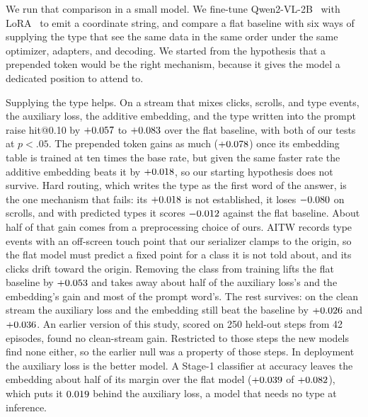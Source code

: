 \documentclass[letterpaper]{article} %
\makeatletter
\newcommand{\hitat}[1]{hit@#1}
\makeatother
\begin{document}
We run that comparison in a small model. We fine-tune Qwen2-VL-2B~\citep{qwen2vl} with LoRA~\citep{lora} to emit a coordinate string, and compare a flat baseline with six ways of supplying the type that see the same data in the same order under the same optimizer, adapters, and decoding. We started from the hypothesis that a prepended token would be the right mechanism, because it gives the model a dedicated position to attend to.

Supplying the type helps. On a stream that mixes clicks, scrolls, and type events, the auxiliary loss, the additive embedding, and the type written into the prompt raise \hitat{0.10} by $+0.057$ to $+0.083$ over the flat baseline, with both of our tests at $p < .05$. The prepended token gains as much ($+0.078$) once its embedding table is trained at ten times the base rate, but given the same faster rate the additive embedding beats it by $+0.018$, so our starting hypothesis does not survive. Hard routing, which writes the type as the first word of the answer, is the one mechanism that fails: its $+0.018$ is not established, it loses $-0.080$ on scrolls, and with predicted types it scores $-0.012$ against the flat baseline.
About half of that gain comes from a preprocessing choice of ours. AITW records type events with an off-screen touch point that our serializer clamps to the origin, so the flat model must predict a fixed point for a class it is not told about, and its clicks drift toward the origin. Removing the class from training lifts the flat baseline by $+0.053$ and takes away about half of the auxiliary loss's and the embedding's gain and most of the prompt word's. The rest survives: on the clean stream the auxiliary loss and the embedding still beat the baseline by $+0.026$ and $+0.036$. An earlier version of this study, scored on 250 held-out steps from 42 episodes, found no clean-stream gain. Restricted to those steps the new models find none either, so the earlier null was a property of those steps. In deployment the auxiliary loss is the better model. A Stage-1 classifier at \nSacc{} accuracy leaves the embedding about half of its margin over the flat model ($+0.039$ of $+0.082$), which puts it $0.019$ behind the auxiliary loss, a model that needs no type at inference.
\end{document}

